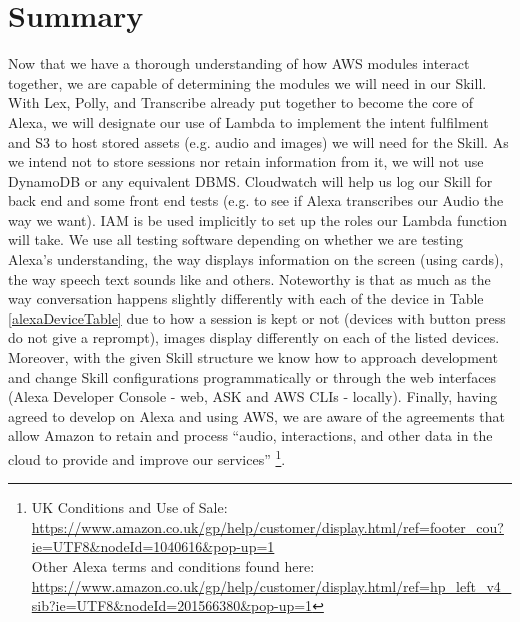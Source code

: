\section{Summary}
Now that we have a thorough understanding of how AWS modules interact together, we are capable of determining the modules we will need in our Skill. With Lex, Polly, and Transcribe already put together to become the core of Alexa, we will designate our use of Lambda to implement the intent fulfilment and S3 to host stored assets (e.g. audio and images) we will need for the Skill. As we intend not to store sessions nor retain information from it, we will not use DynamoDB or any equivalent DBMS. Cloudwatch will help us log our Skill for back end and some front end tests (e.g. to see if Alexa transcribes our Audio the way we want). IAM is be used implicitly to set up the roles our Lambda function will take.  We use all testing software depending on whether we are testing Alexa's understanding, the way displays information on the screen (using cards), the way speech text sounds like and others. Noteworthy is that as much as the way conversation happens slightly differently with each of the device in Table \ref{alexaDeviceTable} due to how a session is kept or not (devices with button press do not give a reprompt), images display differently on each of the listed devices.%
Moreover, with the given Skill structure we know how to approach development and change Skill configurations %
programmatically
or through the web interfaces (Alexa Developer Console - web, ASK and AWS CLIs - locally). 
Finally, having agreed to develop on Alexa and using AWS, we are aware of the agreements that allow Amazon to retain and process ``audio, interactions, and other data in the cloud to provide and improve our services'' \footnote{UK Conditions and Use of Sale: \url{https://www.amazon.co.uk/gp/help/customer/display.html/ref=footer_cou?ie=UTF8&nodeId=1040616&pop-up=1}\\
Other Alexa terms and conditions found here: \url{https://www.amazon.co.uk/gp/help/customer/display.html/ref=hp_left_v4_sib?ie=UTF8&nodeId=201566380&pop-up=1}
}.


